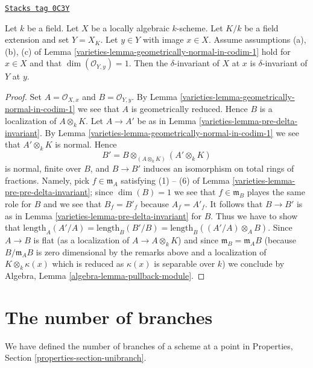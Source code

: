 \begin{lemma}
\label{varieties-lemma-delta-invariant-and-change-of-fields-better}
\href{https://stacks.math.columbia.edu/tag/0C3Y}{\texttt{Stacks tag 0C3Y}}

Let $k$ be a field. Let $X$ be a locally algebraic $k$-scheme.
Let $K/k$ be a field extension and set $Y = X_K$.
Let $y \in Y$ with image $x \in X$.
Assume assumptions (a), (b), (c) of
Lemma \ref{varieties-lemma-geometrically-normal-in-codim-1}
hold for $x \in X$ and that $\dim(\mathcal{O}_{Y, y}) = 1$.
Then the $\delta$-invariant
of $X$ at $x$ is $\delta$-invariant of $Y$ at $y$.
\end{lemma}

\begin{proof}

Set $A = \mathcal{O}_{X, x}$ and $B = \mathcal{O}_{Y, y}$.
By Lemma \ref{varieties-lemma-geometrically-normal-in-codim-1}
we see that $A$ is geometrically reduced.
Hence $B$ is a localization of $A \otimes_k K$.
Let $A \to A'$ be as in Lemma \ref{varieties-lemma-pre-delta-invariant}.
By Lemma \ref{varieties-lemma-geometrically-normal-in-codim-1}
we see that $A' \otimes_k K$ is normal.
Hence
$$
B' = B \otimes_{(A \otimes_k K)} (A' \otimes_k K)
$$
is normal, finite over $B$, and $B \to B'$ induces
an isomorphism on total rings of fractions. Namely, pick $f \in \mathfrak m_A$
satisfying (1) -- (6) of Lemma \ref{varieties-lemma-pre-pre-delta-invariant};
since $\dim(B) = 1$ we see that $f \in \mathfrak m_B$
playes the same role for $B$ and we see that $B_f = B'_f$ because $A_f = A'_f$.
It follows that $B \to B'$ is as in Lemma \ref{varieties-lemma-pre-delta-invariant}
for $B$. Thus we have to show that
$\text{length}_A(A'/A) =
\text{length}_B(B'/B) = \text{length}_B((A'/A) \otimes_A B)$.
Since $A \to B$ is flat (as a localization of $A \to A \otimes_k K$)
and since $\mathfrak m_B = \mathfrak m_A B$ (because
$B/\mathfrak m_A B$ is zero dimensional by the remarks above and
a localization of $K \otimes_k \kappa(x)$ which is reduced as
$\kappa(x)$ is separable over $k$) we conclude by
Algebra, Lemma \ref{algebra-lemma-pullback-module}.
\end{proof}

\section{The number of branches}
\label{varieties-section-number-of-branches}
We have defined the number of branches of a scheme at a point
in Properties, Section \ref{properties-section-unibranch}.

